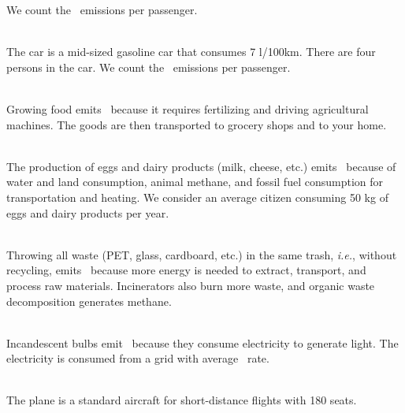 \begin{enumerateb}
	We count the \COtwo\ emissions per passenger. \\
	\item {} \\
	The car is a mid-sized gasoline car that consumes 7 l/100km.
	There are four persons in the car.
	We count the \COtwo\ emissions per passenger. \\
	\item {} \\
	Growing food emits \COtwo\ because it requires fertilizing and driving agricultural machines.
	The goods are then transported to grocery shops and to your home. \\
	\item {} \\
	The production of eggs and dairy products (milk, cheese, etc.) emits \COtwo\ because of water and land consumption, animal methane, and fossil fuel consumption for transportation and heating.
	We consider an average citizen consuming 50 kg of eggs and dairy products per year. \\
	\item {} \\
	Throwing all waste (PET, glass, cardboard, etc.) in the same trash, \textit{i.e.}, without recycling, emits \COtwo\ because more energy is needed to extract, transport, and process raw materials.
	Incinerators also burn more waste, and organic waste decomposition generates methane. \\
	\item {} \\
	Incandescent bulbs emit \COtwo\ because they consume electricity to generate light.
	The electricity is consumed from a grid with average \COtwo\ rate. \\
	\item {} \\
	The plane is a standard aircraft for short-distance flights with 180 seats.

\end{enumerateb}
